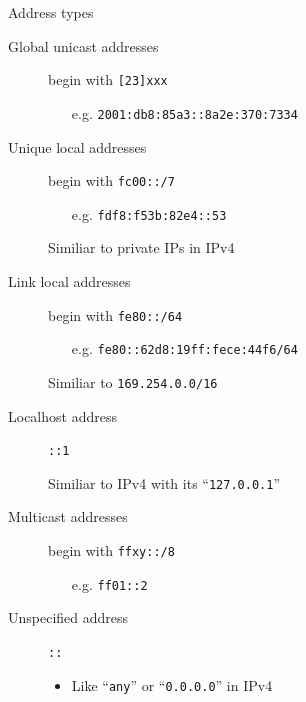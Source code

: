 \begin{frame}{Address types}
  \begin{description}
  \item[Global unicast addresses] begin with \texttt{[23]xxx}
    \begin{itemize}
    \item[e.g.] \texttt{2001:db8:85a3::8a2e:370:7334}
    \end{itemize}
  \item[Unique local addresses] begin with \texttt{fc00::/7}
    \begin{itemize}
    \item[e.g.] \texttt{fdf8:f53b:82e4::53}
    \end{itemize}
    Similiar to private IPs in IPv4
  \item[Link local addresses] begin with \texttt{fe80::/64}
    \begin{itemize}
    \item[e.g.] \texttt{fe80::62d8:19ff:fece:44f6/64}
    \end{itemize}
    Similiar to \texttt{169.254.0.0/16}
  \item[Localhost address] \texttt{::1}\par
    Similiar to IPv4 with its ``\texttt{127.0.0.1}''
  \item[Multicast addresses] begin with \texttt{ffxy::/8}
    \begin{itemize}
    \item[e.g.] \texttt{ff01::2}
    \end{itemize}
  \item[Unspecified address] \texttt{::}
    \begin{itemize}
    \item Like ``\texttt{any}'' or ``\texttt{0.0.0.0}'' in IPv4
    \end{itemize}
  \end{description}
\end{frame}
